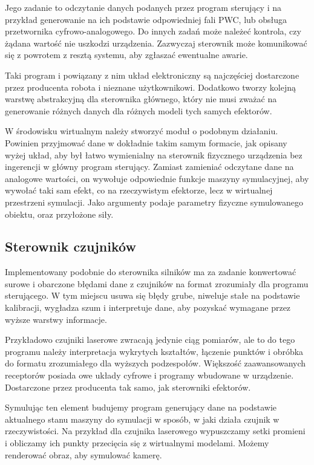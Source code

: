 Jego zadanie to odczytanie danych podanych przez program sterujący i na przykład generowanie na ich podstawie odpowiedniej fali PWC, lub obsługa przetwornika cyfrowo-analogowego.
Do innych zadań może należeć kontrola, czy żądana wartość nie uszkodzi urządzenia.
Zazwyczaj sterownik może komunikować się z powrotem z resztą systemu, aby zgłaszać ewentualne awarie.

Taki program i powiązany z nim układ elektroniczny są najczęściej dostarczone przez producenta robota i nieznane użytkownikowi.
Dodatkowo tworzy kolejną warstwę abstrakcyjną dla sterownika głównego, który nie musi zważać na generowanie różnych danych dla różnych modeli tych samych efektorów.
 
W środowisku wirtualnym należy stworzyć moduł o podobnym działaniu.
Powinien przyjmować dane w dokładnie takim samym formacie, jak opisany wyżej układ, aby był łatwo wymienialny na sterownik fizycznego urządzenia bez ingerencji w główny program sterujący.
Zamiast zamieniać odczytane dane na analogowe wartości, on wywołuje odpowiednie funkcje maszyny symulacyjnej, aby wywołać taki sam efekt, co na rzeczywistym efektorze, lecz w wirtualnej przestrzeni symulacji.
Jako argumenty podaje parametry fizyczne symulowanego obiektu, oraz przyłożone siły.
 

\subsection{Sterownik czujników}
Implementowany podobnie do sterownika silników ma za zadanie konwertować surowe i obarczone błędami dane z czujników na format zrozumiały dla programu sterującego.
W tym miejscu usuwa się błędy grube, niweluje stałe na podstawie kalibracji, wygładza szum i interpretuje dane, aby pozyskać wymagane przez wyższe warstwy informacje.

Przykładowo czujniki laserowe zwracają jedynie ciąg pomiarów, ale to do tego programu należy interpretacja wykrytych kształtów, łączenie punktów i obróbka do formatu zrozumiałego dla wyższych podzespołów.
Większość zaawansowanych receptorów posiada owe układy cyfrowe i programy wbudowane w urządzenie.
Dostarczone przez producenta tak samo, jak sterowniki efektorów.
 
Symulując ten element budujemy program generujący dane na podstawie aktualnego stanu maszyny do symulacji w sposób, w jaki działa czujnik w rzeczywistości.
Na przykład dla czujnika laserowego wypuszczamy setki promieni i obliczamy ich punkty przecięcia się z wirtualnymi modelami.
Możemy renderować obraz, aby symulować kamerę.

